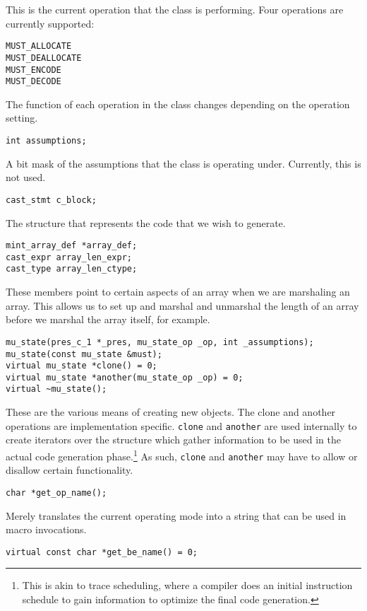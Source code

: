 This is the current operation that the \mus{} class is performing.  Four
operations are currently supported:

\begin{verbatim}
MUST_ALLOCATE
MUST_DEALLOCATE
MUST_ENCODE
MUST_DECODE
\end{verbatim}

The function of each operation in the \mus{} class changes depending on the
operation setting.

\noindent\verb|int assumptions;|

A bit mask of the assumptions that the \mus{} class is operating under.
Currently, this is not used.

\noindent\verb|cast_stmt c_block;|

The \cast{} structure that represents the code that we wish to generate.

\begin{verbatim}
mint_array_def *array_def;
cast_expr array_len_expr;
cast_type array_len_ctype;
\end{verbatim}

These members point to certain aspects of an array when we are marshaling an
array.  This allows us to set up and marshal and unmarshal the length of an
array before we marshal the array itself, for example.

\begin{verbatim}
mu_state(pres_c_1 *_pres, mu_state_op _op, int _assumptions);
mu_state(const mu_state &must);
virtual mu_state *clone() = 0;
virtual mu_state *another(mu_state_op _op) = 0;
virtual ~mu_state();
\end{verbatim}

These are the various means of creating new \mus{} objects.  The clone and
another operations are implementation specific.  \texttt{clone} and
\texttt{another} are used internally to create iterators over the \cpres{}
structure which gather information to be used in the actual code generation
phase.\footnote{This is akin to trace scheduling, where a compiler does an
initial instruction schedule to gain information to optimize the final code
generation.}  As such, \texttt{clone} and \texttt{another} may have to allow or
disallow certain functionality.

\noindent\verb|char *get_op_name();|

Merely translates the current operating mode into a string that can be used in
macro invocations.

\noindent\verb|virtual const char *get_be_name() = 0;|

